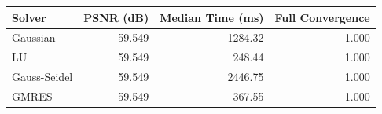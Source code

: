 \begin{tabular}{lrrr}
\toprule
Solver & PSNR (dB) & Median Time (ms) & Full Convergence\\
\midrule
Gaussian & 59.549 & 1284.32 & 1.000\\
LU & 59.549 & 248.44 & 1.000\\
Gauss-Seidel & 59.549 & 2446.75 & 1.000\\
GMRES & 59.549 & 367.55 & 1.000\\
\bottomrule
\end{tabular}
